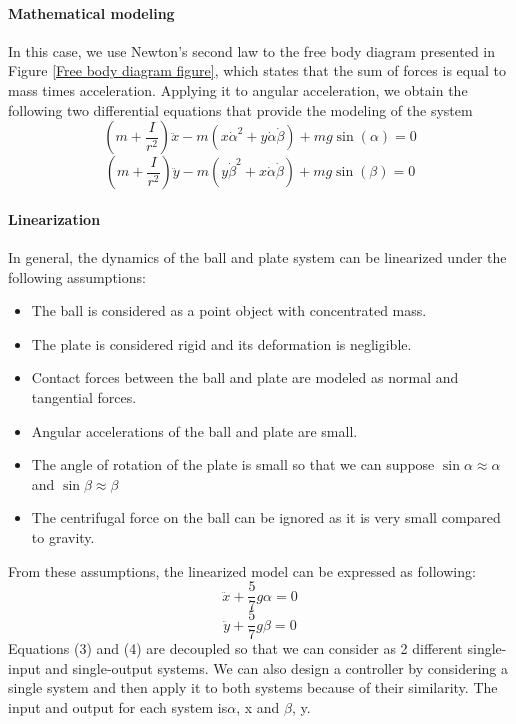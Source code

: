     \paragraph{Mathematical modeling}
    In this case, we use Newton's second law to the free body diagram presented in Figure \ref{Free body diagram figure}, which states that the sum of forces is equal to mass times acceleration. Applying it to angular acceleration, we obtain the following two differential equations that provide the modeling of the system
    \begin{equation}
    (m+\frac{I}{r^2})\ddot{x}-m(x\dot{\alpha}^2+y\dot{\alpha}\dot{\beta})+mg\sin(\alpha)=0
    \end{equation}
    \begin{equation}
    (m+\frac{I}{r^2})\ddot{y}-m(y\dot{\beta}^2+x\dot{\alpha}\dot{\beta})+mg\sin(\beta)=0
    \end{equation}
    \paragraph{Linearization}
    In general, the dynamics of the ball and plate system can be linearized under the following assumptions: 
    \begin{itemize}
\item The ball is considered as a point object with concentrated mass.
\item The plate is considered rigid and its deformation is negligible.
\item Contact forces between the ball and plate are modeled as normal and tangential forces.
\item Angular accelerations of the ball and plate are small.
\item The angle of rotation of the plate is small so that we can
suppose $\sin{\alpha} \approx \alpha $ and $\sin{\beta} \approx \beta $
\item The centrifugal force on the ball can be ignored as it is very
small compared to gravity.
\end{itemize}
    From these assumptions, the linearized model can be expressed
as following:
\begin{equation}
\ddot{x}+\frac{5}{7}g\alpha=0
\end{equation}
\begin{equation}
\ddot{y}+\frac{5}{7}g\beta=0
\end{equation}
    Equations (3) and (4) are decoupled so that we can consider as 2 different single-input and single-output systems. We can also design a controller by considering a single system and then apply it to both systems because of their similarity. The input and output for each system is$\alpha$, x and $\beta$, y.
    
